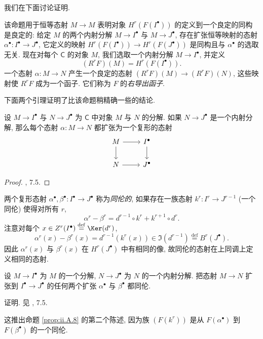我们在下面讨论证明.

该命题用于恒等态射 $M\to M$ 表明对象 $H^r(F(I^\bullet))$ 的定义到一个良定的同构是良定的: 给定 $M$ 的两个内射分解 $M\to I^\bullet$ 与 $M\to J^\bullet$, 存在扩张恒等映射的态射 $\alpha^\bullet\colon I^\bullet\to J^\bullet$, 它定义的映射 $H^r(F(I^\bullet))\to H^r(F(J^\bullet))$ 是同构且与 $\alpha^\bullet$ 的选取无关. 现在对每个 $\mathsf{C}$ 的对象 $M$, 我们选取一个内射分解 $M\to I^\bullet$, 并定义
\[
 (R^rF)(M)=H^r(F(I^\bullet)).
\]
一个态射 $\alpha\colon M\to N$ 产生一个良定的态射 $(R^rF)(M)\to (R^rF)(N)$, 这些映射使 $R^rF$ 成为一个函子. 它们称为 $F$ 的\emph{右导出函子}.

下面两个引理证明了比该命题稍精确一些的结论.

\begin{lemma}\label{lem:ii.A.9}
设 $M\to I^\bullet$ 与 $N\to J^\bullet$ 为 $\mathsf{C}$ 中对象 $M$ 与 $N$ 的分解. 如果 $N\to J^\bullet$ 是一个内射分解, 那么每个态射 $\alpha\colon M\to N$ 都扩张为一个复形的态射
\[
 \begin{tikzcd}
 M \ar[r] \ar[d] & I^\bullet \ar[d] \\
 N \ar[r] & J^\bullet
 \end{tikzcd}
\]
\end{lemma}

\begin{proof}
\cite{BucurDeleanu1968}, 7.5.
\end{proof}

两个复形态射 $\alpha^\bullet,\beta^\bullet\colon I^\bullet\to J^\bullet$ 称为\emph{同伦的}, 如果存在一族态射 $k^r\colon I^r\to J^{r-1}$ (一个同伦) 使得对所有 $r$,
\[
 \alpha^r-\beta^r=d^{r-1}\circ k^r+k^{r+1}\circ d^r.
\]
注意对每个 $x\in Z^r(I^\bullet)\stackrel{\mathrm{def}}{=}\Ker(d^r)$,
\[
 \alpha^r(x)-\beta^r(x)=d^{r-1}(k^r(x))\in \Im(d^{r-1})\stackrel{\mathrm{def}}{=}B^r(J^\bullet).
\]
因此 $\alpha^r(x)$ 与 $\beta^r(x)$ 在 $H^r(J^\bullet)$ 中有相同的像, 故同伦的态射在上同调上定义相同的态射.

\begin{lemma}\label{lem:ii.A.10}
设 $M\to I^\bullet$ 为 $M$ 的一个分解, $N\to J^\bullet$ 为 $N$ 的一个内射分解. 把态射 $M\to N$ 扩张到 $I^\bullet\to J^\bullet$ 的任何两个扩张 $\alpha^\bullet$ 与 $\beta^\bullet$ 都同伦.
\end{lemma}

\noindent 证明. 见 \cite{BucurDeleanu1968}, 7.5.

这推出命题 \ref{prop:ii.A.8} 的第二个陈述, 因为族 $(F(k^r))$ 是从 $F(\alpha^\bullet)$ 到 $F(\beta^\bullet)$ 的一个同伦.

